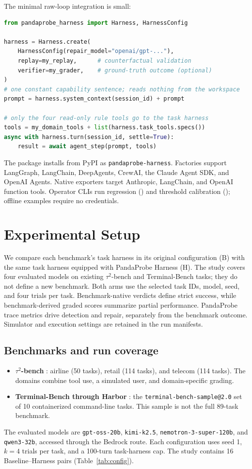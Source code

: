 \documentclass[11pt,letterpaper]{article}
\begin{document}
The minimal raw-loop integration is small:
\begin{lstlisting}[language=Python]
from pandaprobe_harness import Harness, HarnessConfig

harness = Harness.create(
    HarnessConfig(repair_model="openai/gpt-..."),
    replay=my_replay,      # counterfactual validation
    verifier=my_grader,    # ground-truth outcome (optional)
)
# one constant capability sentence; reads nothing from the workspace
prompt = harness.system_context(session_id) + prompt

# only the four read-only rule tools go to the task harness
tools = my_domain_tools + list(harness.task_tools.specs())
async with harness.turn(session_id, settle=True):
    result = await agent_step(prompt, tools)
\end{lstlisting}
The package installs from PyPI as \texttt{pandaprobe-harness}. Factories support
LangGraph, LangChain, DeepAgents, CrewAI, the Claude Agent SDK, and OpenAI Agents. Native
exporters target Anthropic, LangChain, and OpenAI function tools. Operator CLIs run regression
() and threshold calibration
(); offline examples require no credentials.

\section{Experimental Setup}
\label{sec:setup}

We compare each benchmark's task harness in its original configuration (B)
with the same task harness equipped with PandaProbe Harness (H). The study covers four
evaluated models on existing $\tau^2$-bench and Terminal-Bench tasks; they do
not define a new benchmark. Both arms use the selected task IDs, model, seed,
and four trials per task. Benchmark-native verdicts define strict success,
while benchmark-derived graded scores summarize partial performance.
PandaProbe trace metrics drive detection and repair, separately from the
benchmark outcome. Simulator and execution settings are retained in the run
manifests.

\subsection{Benchmarks and run coverage}
\begin{itemize}[leftmargin=*,itemsep=2pt]
\item \textbf{$\tau^2$-bench} \citep{barres2025tau}: airline (50 tasks),
retail (114 tasks), and telecom (114 tasks). The domains combine tool use,
a simulated user, and domain-specific grading.
\item \textbf{Terminal-Bench through Harbor} \citep{merrill2026terminal}:
the \texttt{terminal-bench-sample@2.0} set of 10 containerized command-line
tasks. This sample is not the full 89-task benchmark.
\end{itemize}
The evaluated models are \texttt{gpt-oss-20b}, \texttt{kimi-k2.5},
\texttt{nemotron-3-super-120b}, and \texttt{qwen3-32b}, accessed through
the Bedrock route. Each configuration uses seed 1, $k=4$ trials per task,
and a 100-turn task-harness cap. The study contains 16
Baseline--Harness pairs (Table~\ref{tab:config}).
\end{document}
